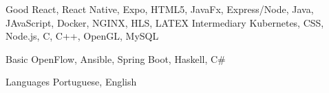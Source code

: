 

  
\begin{cvskills}

  \cvskill
    {Good} %
    {React, React Native, Expo, HTML5, JavaFx, Express/Node, Java, JAvaScript, Docker, NGINX, HLS, LATEX }
  \cvskill
    {Intermediary} %
    {Kubernetes, CSS, Node.js, C, C++, OpenGL, MySQL} %

  \cvskill
    {Basic} %
    {OpenFlow, Ansible, Spring Boot, Haskell, C#}

  \cvskill
    {Languages} %
    {Portuguese, English} %

\end{cvskills}
